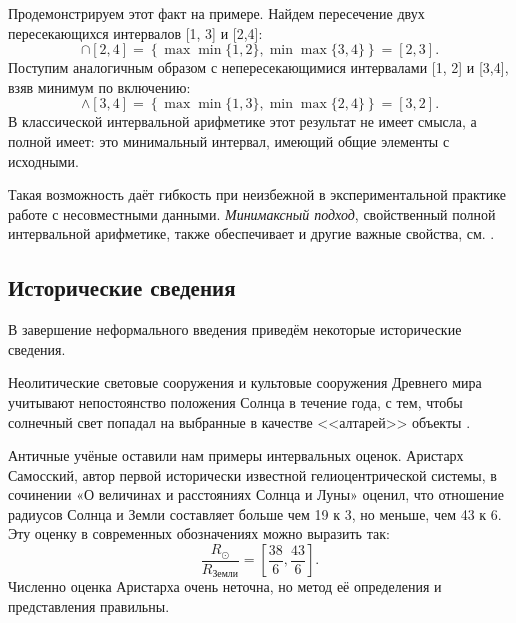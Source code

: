 \documentclass[a5paper,openany]{book}
\begin{document}
Продемонстрируем этот факт на примере. Найдем пересечение двух пересекающихся интервалов [1, 3] и [2,4]:
\begin{equation*}
[1, 3] \cap [2,4] = \left\lbrace \max \min \{1,2\}, \min \max \{3,4 \}  \right\rbrace   = [2,3].
\end{equation*}
Поступим аналогичным образом с непересекающимися интервалами [1, 2] и [3,4], взяв минимум по включению:
\begin{equation*}
[1, 2] \wedge [3,4] = \left\lbrace \max \min \{1,3\}, \min \max \{2,4 \}  \right\rbrace   = [3,2].
\end{equation*}
В классической интервальной арифметике этот результат не имеет смысла, а полной имеет: это минимальный интервал, имеющий общие элементы с исходными.

Такая возможность даёт гибкость при неизбежной в экспериментальной практике работе с несовместными данными. \emph{Минимаксный подход}, свойственный полной интервальной арифметике, также обеспечивает и другие важные свойства, см. \cite{SharyBook}. 


\subsection{Исторические сведения}

В завершение неформального введения приведём некоторые исторические сведения.

Неолитические световые сооружения и культовые сооружения Древнего мира учитывают непостоянство положения Солнца в течение года, с тем, чтобы солнечный свет попадал на выбранные в качестве <<алтарей>> объекты \cite{OpticsHistory}.  

Античные учёные оставили нам примеры интервальных оценок. 
Аристарх Самосский, автор первой исторически известной гелиоцентрической системы, в сочинении «О величинах и расстояниях Солнца и Луны» \cite{Veselovcky1961} оценил, что отношение радиусов Солнца и Земли составляет больше чем 19 к 3, но меньше, чем 43 к 6. Эту оценку в современных обозначениях можно выразить так: 
\begin{equation*}
\frac{R_{\odot}}{R_{\text{Земли}}} = \left[  \frac{38}{6}, \frac{43}{6}\right].
\end{equation*}
Численно оценка Аристарха очень неточна, но метод её определения и представления правильны.
\end{document}

